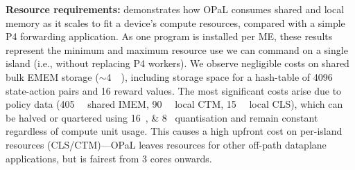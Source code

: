 \documentclass[
sigconf,natbib=false
]{acmart}
\newcommand{\fakepara}[1]{\noindent\textbf{#1:}}
\newcommand{\approachshort}{OPaL}
\newcommand{\Coopfw}{\emph{CoOp}}
\newcommand{\Indfw}{\emph{Ind}}
\begin{document}
\fakepara{Resource requirements}
 demonstrates how \approachshort{} consumes shared and local memory as it scales to fit a device's compute resources, compared with a simple P4 forwarding application.
As one program is installed per ME, these results represent the minimum and maximum resource use we can command on a single island (i.e., without replacing P4 workers).
We observe negligible costs on shared bulk EMEM storage ($\sim$\SI{4}{\mebi\byte}), including storage space for a hash-table of \num{4096} state-action pairs and \num{16} reward values.
The most significant costs arise due to policy data (\SI{405}{\kibi\byte} shared IMEM, \SI{90}{\kibi\byte} local CTM, \SI{15}{\kibi\byte} local CLS), which can be halved or quartered using \SIlist{16;8}{\bit} quantisation and remain constant regardless of compute unit usage.
This causes a high upfront cost on per-island resources (CLS/CTM)---\approachshort{} leaves resources for other off-path dataplane applications, but is fairest from 3 cores onwards.

\end{document}
